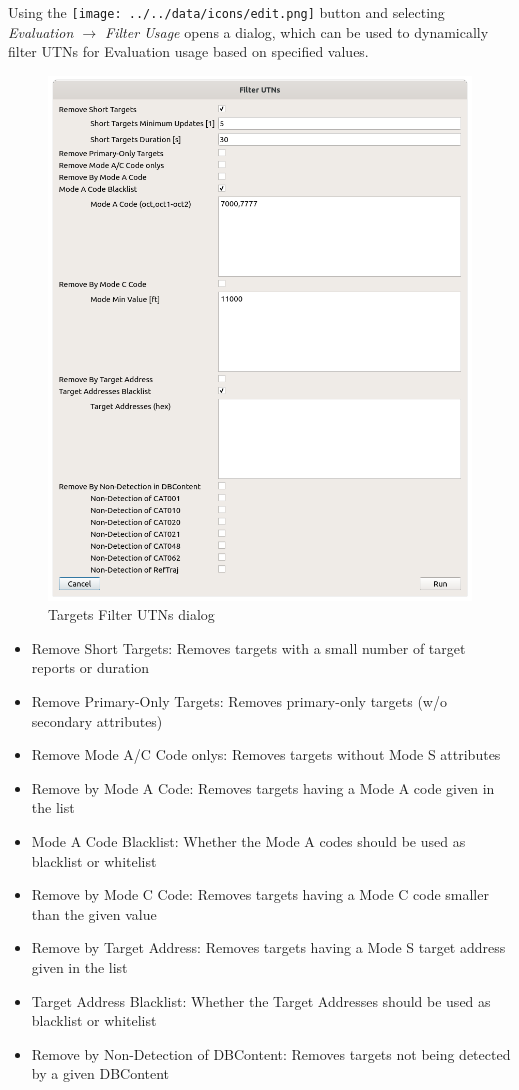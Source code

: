 Using the \texttt{[image: ../../data/icons/edit.png]} button and selecting \textit{Evaluation $\rightarrow$ Filter Usage} opens a dialog, 
which can be used to dynamically filter UTNs for Evaluation usage based on specified values.

\begin{figure}[H]
    \includegraphics[width=15cm]{figures/filter_utns.png}
  \caption{Targets Filter UTNs dialog}
\end{figure}

\begin{itemize}  
\item Remove Short Targets: Removes targets with a small number of target reports or duration
\item Remove Primary-Only Targets: Removes primary-only targets (w/o secondary attributes)
\item Remove Mode A/C Code onlys: Removes targets without Mode S attributes
\item Remove by Mode A Code: Removes targets having a Mode A code given in the list
\item Mode A Code Blacklist: Whether the Mode A codes should be used as blacklist or whitelist
\item Remove by Mode C Code: Removes targets having a Mode C code smaller than the given value
\item Remove by Target Address: Removes targets having a Mode S target address given in the list
\item Target Address Blacklist: Whether the Target Addresses should be used as blacklist or whitelist
\item Remove by Non-Detection of DBContent: Removes targets not being detected by a given DBContent
\end{itemize}
\ \\

